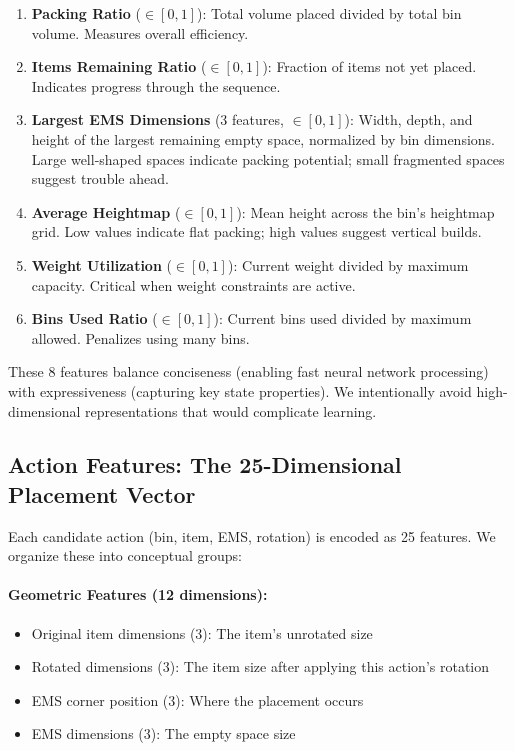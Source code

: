 \begin{enumerate}
    \item \textbf{Packing Ratio} ($\in [0,1]$): Total volume placed divided by total bin volume. Measures overall efficiency.

    \item \textbf{Items Remaining Ratio} ($\in [0,1]$): Fraction of items not yet placed. Indicates progress through the sequence.

    \item \textbf{Largest EMS Dimensions} (3 features, $\in [0,1]$): Width, depth, and height of the largest remaining empty space, normalized by bin dimensions. Large well-shaped spaces indicate packing potential; small fragmented spaces suggest trouble ahead.

    \item \textbf{Average Heightmap} ($\in [0,1]$): Mean height across the bin's heightmap grid. Low values indicate flat packing; high values suggest vertical builds.

    \item \textbf{Weight Utilization} ($\in [0,1]$): Current weight divided by maximum capacity. Critical when weight constraints are active.

    \item \textbf{Bins Used Ratio} ($\in [0,1]$): Current bins used divided by maximum allowed. Penalizes using many bins.
\end{enumerate}

These 8 features balance conciseness (enabling fast neural network processing) with expressiveness (capturing key state properties). We intentionally avoid high-dimensional representations that would complicate learning.

\subsection{Action Features: The 25-Dimensional Placement Vector}

Each candidate action (bin, item, EMS, rotation) is encoded as 25 features. We organize these into conceptual groups:

\paragraph{Geometric Features (12 dimensions):}
\begin{itemize}
    \item Original item dimensions (3): The item's unrotated size
    \item Rotated dimensions (3): The item size after applying this action's rotation
    \item EMS corner position (3): Where the placement occurs
    \item EMS dimensions (3): The empty space size
\end{itemize}

